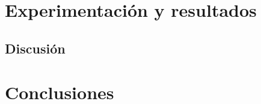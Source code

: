 \documentclass[a4paper,10pt,twocolumn]{article}
\begin{document}


 
 










\section{Experimentaci\'{o}n y resultados}
\subsection{Discusi\'{o}n}

\section{Conclusiones}\label{sec:conc}
 
 



 






\begin{thebibliography}{99}
	\bibitem{}

\end{thebibliography}


\label{end}
\end{document}
